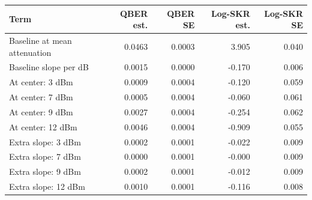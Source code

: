 \begin{tabular}{lrrrr}
\toprule
Term & QBER est. & QBER SE & Log-SKR est. & Log-SKR SE \\
\midrule
Baseline at mean attenuation & 0.0463 & 0.0003 & 3.905 & 0.040 \\
Baseline slope per dB & 0.0015 & 0.0000 & -0.170 & 0.006 \\
At center: 3 dBm & 0.0009 & 0.0004 & -0.120 & 0.059 \\
At center: 7 dBm & 0.0005 & 0.0004 & -0.060 & 0.061 \\
At center: 9 dBm & 0.0027 & 0.0004 & -0.254 & 0.062 \\
At center: 12 dBm & 0.0046 & 0.0004 & -0.909 & 0.055 \\
Extra slope: 3 dBm & 0.0002 & 0.0001 & -0.022 & 0.009 \\
Extra slope: 7 dBm & 0.0000 & 0.0001 & -0.000 & 0.009 \\
Extra slope: 9 dBm & 0.0002 & 0.0001 & -0.012 & 0.009 \\
Extra slope: 12 dBm & 0.0010 & 0.0001 & -0.116 & 0.008 \\
\bottomrule
\end{tabular}
